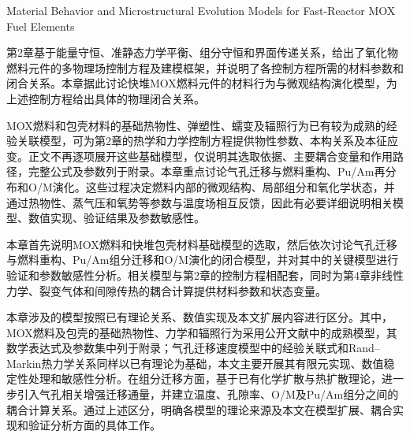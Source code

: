 

{Material Behavior and Microstructural Evolution Models for Fast-Reactor MOX Fuel Elements}
\label{chap:material_microstructure_models}

\label{sec:ch3_introduction}

第2章基于能量守恒、准静态力学平衡、组分守恒和界面传递关系，给出了氧化物燃料元件的多物理场控制方程及建模框架，并说明了各控制方程所需的材料参数和闭合关系。本章据此讨论快堆MOX燃料元件的材料行为与微观结构演化模型，为上述控制方程给出具体的物理闭合关系。

MOX燃料和包壳材料的基础热物性、弹塑性、蠕变及辐照行为已有较为成熟的经验关联模型，可为第2章的热学和力学控制方程提供物性参数、本构关系及本征应变。正文不再逐项展开这些基础模型，仅说明其选取依据、主要耦合变量和作用路径，完整公式及参数列于附录。本章重点讨论气孔迁移与燃料重构、Pu/Am再分布和O/M演化。这些过程决定燃料内部的微观结构、局部组分和氧化学状态，并通过热物性、蒸气压和氧势等参数与温度场相互反馈，因此有必要详细说明相关模型、数值实现、验证结果及参数敏感性。

本章首先说明MOX燃料和快堆包壳材料基础模型的选取，然后依次讨论气孔迁移与燃料重构、Pu/Am组分迁移和O/M演化的闭合模型，并对其中的关键模型进行验证和参数敏感性分析。相关模型与第2章的控制方程相配套，同时为第4章非线性力学、裂变气体和间隙传热的耦合计算提供材料参数和状态变量。

本章涉及的模型按照已有理论关系、数值实现及本文扩展内容进行区分。其中，MOX燃料及包壳的基础热物性、力学和辐照行为采用公开文献中的成熟模型，其数学表达式及参数集中列于附录；气孔迁移速度模型中的经验关联式和Rand–Markin热力学关系同样以已有理论为基础，本文主要开展其有限元实现、数值稳定性处理和敏感性分析。在组分迁移方面，基于已有化学扩散与热扩散理论，进一步引入气孔相关增强迁移通量，并建立温度、孔隙率、O/M及Pu/Am组分之间的耦合计算关系。通过上述区分，明确各模型的理论来源及本文在模型扩展、耦合实现和验证分析方面的具体工作。

\label{sec:ch3_material_model_selection}

